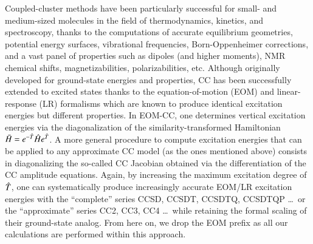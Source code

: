 \documentclass[aip,jcp,reprint,noshowkeys,superscriptaddress]{revtex4-1}
\newcommand{\hH}{\Hat{H}}
\newcommand{\hT}{\Hat{T}}
\newcommand{\bH}{\Bar{H}}
\begin{document}
Coupled-cluster methods have been particularly successful for small- and medium-sized molecules in the field of thermodynamics, kinetics, and spectroscopy, thanks to the computations of accurate equilibrium geometries, \cite{Kallay_2003} potential energy surfaces, vibrational frequencies, \cite{Kallay_2004a} Born-Oppenheimer corrections, \cite{Gauss_2006} and a vast panel of properties such as dipoles (and higher moments), \cite{Kallay_2003}  NMR chemical shifts, \cite{Kallay_2004a} magnetizabilities, \cite{Gauss_2009} polarizabilities, \cite{Kallay_2006} etc.
Although originally developed for ground-state energies and properties, CC has been successfully extended to excited states \cite{Monkhorst_1977} thanks to the equation-of-motion (EOM) \cite{Emrich_1981,Comeau_1993,Stanton_1993,Krylov_2008} and linear-response (LR) \cite{Ghosh_1981,Sekino_1984,Koch_1990a,Koch_1990b,Rico_1993} formalisms which are known to produce identical excitation energies but different properties. 
In EOM-CC, one determines vertical excitation energies via the diagonalization of the similarity-transformed Hamiltonian $\bH = e^{-\hT} \hH e^{\hT}$.
A more general procedure to compute excitation energies that can be applied to any approximate CC model (as the ones mentioned above) consists in diagonalizing the so-called CC Jacobian obtained via the differentiation of the CC amplitude equations.
Again, by increasing the maximum excitation degree of $\hT$, one can systematically produce increasingly accurate EOM/LR excitation energies with the ``complete'' series CCSD, \cite{Stanton_1993} CCSDT, \cite{Kowalski_2001,Kucharski_2001} CCSDTQ, \cite{Hirata_2004} CCSDTQP\cite{Kallay_2004b} \ldots~or the ``approximate'' series CC2, \cite{Christiansen_1995a} CC3, \cite{Christiansen_1995b} CC4 \cite{Kallay_2004b} \ldots~while retaining the formal scaling of their ground-state analog. 
From here on, we drop the EOM prefix as all our calculations are performed within this approach.
\end{document}
